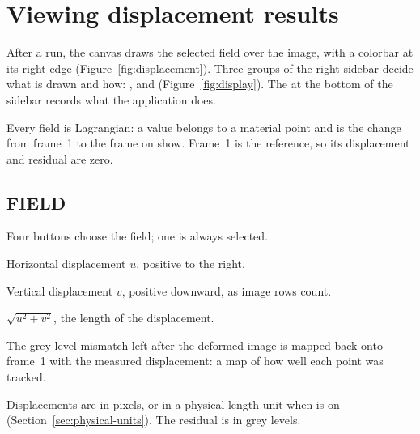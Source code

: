 \section{Viewing displacement results}
\label{sec:results}

After a run, the canvas draws the selected field over the image, with a colorbar at its right
edge (Figure~\ref{fig:displacement}). Three groups of the right sidebar decide what is drawn and
how: ,  and  (Figure~\ref{fig:display}). The
 at the bottom of the sidebar records what the application does.


Every field is Lagrangian: a value belongs to a material point and is the change from frame~1 to
the frame on show. Frame~1 is the reference, so its displacement and residual are zero.

\subsection{FIELD}

Four buttons choose the field; one is always selected.

\begin{description}[leftmargin=1.2cm,style=nextline]
  \item[Disp U]
    Horizontal displacement $u$, positive to the right.
  \item[Disp V]
    Vertical displacement $v$, positive downward, as image rows count.
  \item[Magnitude]
    $\sqrt{u^2 + v^2}$, the length of the displacement.
  \item[Residual]
    The grey-level mismatch left after the deformed image is mapped back onto frame~1 with the
    measured displacement: a map of how well each point was tracked.
\end{description}

Displacements are in pixels, or in a physical length unit when  is on
(Section~\ref{sec:physical-units}). The residual is in grey levels.


